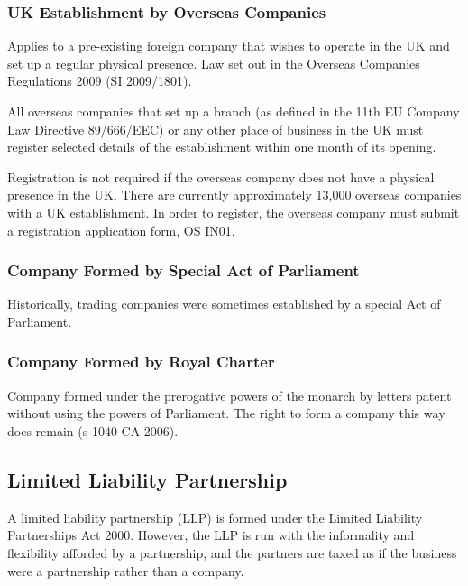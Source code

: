 \documentclass[
]{article}
\begin{document}
\hypertarget{uk-establishment-by-overseas-companies}{%
\subsubsection{UK Establishment by Overseas
Companies}\label{uk-establishment-by-overseas-companies}}

Applies to a pre-existing foreign company that wishes to operate in the
UK and set up a regular physical presence. Law set out in the Overseas
Companies Regulations 2009 (SI 2009/1801).

All overseas companies that set up a branch (as defined in the 11th EU
Company Law Directive 89/666/EEC) or any other place of business in the
UK must register selected details of the establishment within one month
of its opening.

Registration is not required if the overseas company does not have a
physical presence in the UK. There are currently approximately 13,000
overseas companies with a UK establishment. In order to register, the
overseas company must submit a registration application form, OS IN01.

\hypertarget{company-formed-by-special-act-of-parliament}{%
\subsubsection{Company Formed by Special Act of
Parliament}\label{company-formed-by-special-act-of-parliament}}

Historically, trading companies were sometimes established by a special
Act of Parliament.

\hypertarget{company-formed-by-royal-charter}{%
\subsubsection{Company Formed by Royal
Charter}\label{company-formed-by-royal-charter}}

Company formed under the prerogative powers of the monarch by letters
patent without using the powers of Parliament. The right to form a
company this way does remain (s 1040 CA 2006).

\hypertarget{limited-liability-partnership}{%
\subsection{Limited Liability
Partnership}\label{limited-liability-partnership}}

A limited liability partnership (LLP) is formed under the Limited
Liability Partnerships Act 2000. However, the LLP is run with the
informality and flexibility afforded by a partnership, and the partners
are taxed as if the business were a partnership rather than a company.
\end{document}
